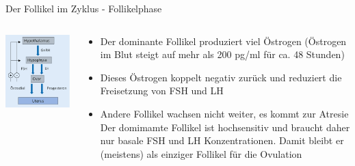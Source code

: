 \documentclass{beamer}
\begin{document}
\begin{frame}{Der Follikel im Zyklus - Follikelphase}

\begin{columns}[c]

\begin{column}{4cm}

\begin{center}
\includegraphics[width=\textwidth]{hypothalamus_hypophyse_ovar.png}
\end{center}

\end{column}

\begin{column}{7cm}
\begin{itemize}
    \item 
    Der dominante Follikel produziert viel Östrogen  (Östrogen im Blut steigt auf mehr als  200 pg/ml für ca. 48 Stunden)
    \pause
    \item
    Dieses Östrogen koppelt negativ zurück und reduziert die Freisetzung von FSH und LH
    \pause
    \item
    Andere Follikel wachsen nicht weiter, es kommt zur Atresie
    \pause
    Der domimamte Follikel ist hochsensitiv und braucht daher nur basale FSH und LH Konzentrationen. Damit bleibt er (meistens) als einziger Follikel für die Ovulation

\end{itemize}
\end{column}
\end{columns}


\end{frame}
\end{document}
